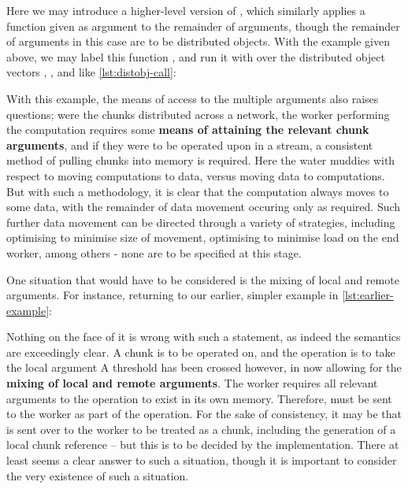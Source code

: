 
Here we may introduce a higher-level version of ,
which similarly applies a function given as argument to the remainder of
arguments, though the remainder of arguments in this case are to be
distributed objects. With the example given above, we may label this
function , and run it with 
over the distributed object vectors , , and
 like \cref{lst:distobj-call}:


With this example, the means of access to the multiple arguments also
raises questions; were the chunks distributed across a network, the
worker performing the computation requires some \textbf{means of
    attaining the relevant chunk arguments}, and if they were to be operated
upon in a stream, a consistent method of pulling chunks into memory is
required. Here the water muddies with respect to moving computations to
data, versus moving data to computations. But with such a methodology,
it is clear that the computation always moves to some data, with the
remainder of data movement occuring only as required. Such further data
movement can be directed through a variety of strategies, including
optimising to minimise size of movement, optimising to minimise load on
the end worker, among others - none are to be specified at this stage.

One situation that would have to be considered is the mixing of local
and remote arguments. For instance, returning to our earlier, simpler
example in \cref{lst:earlier-example}:


Nothing on the face of it is wrong with such a statement, as indeed the
semantics are exceedingly clear. A chunk is to be operated on, and the
operation is to take the local argument  A threshold
has been crossed however, in now allowing for the \textbf{mixing of
    local and remote arguments}. The worker requires all relevant arguments
to the operation to exist in its own memory. Therefore,
 must be sent to the worker as part of the operation.
For the sake of consistency, it may be that  is sent over
to the worker to be treated as a chunk, including the generation of a
local chunk reference -- but this is to be decided by the
implementation. There at least seems a clear answer to such a situation,
though it is important to consider the very existence of such a
situation.

